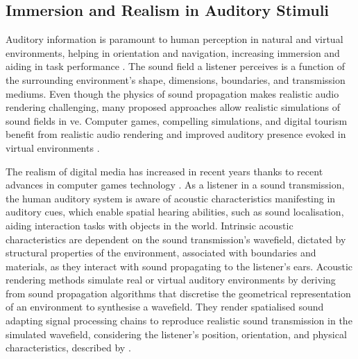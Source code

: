 \subsection{Immersion and Realism in Auditory Stimuli}
Auditory information is paramount to human perception in natural and virtual environments, helping in orientation and navigation, increasing immersion and aiding in task performance \citep{lokki2005navigation, bork2015auditory, shivappa2016efficient}. The sound field a listener perceives is a function of the surrounding environment's shape, dimensions, boundaries, and transmission mediums. Even though the physics of sound propagation makes realistic audio rendering challenging, many proposed approaches allow realistic simulations of sound fields in \acrshort{ve}. Computer games, compelling simulations, and digital tourism benefit from realistic audio rendering and improved auditory presence evoked in virtual environments \citep{lokki2002creating, selmanovic2020vr}.\par
The realism of digital media has increased in recent years thanks to recent advances in computer games technology \citep{rubio2017immersive}. As a listener in a sound transmission, the human auditory system is aware of acoustic characteristics manifesting in auditory cues, which enable spatial hearing abilities, such as sound localisation, aiding interaction tasks with objects in the world. Intrinsic acoustic characteristics are dependent on the sound transmission's wavefield, dictated by structural properties of the environment, associated with boundaries and materials, as they interact with sound propagating to the listener's ears. Acoustic rendering methods simulate real or virtual auditory environments by deriving from sound propagation algorithms that discretise the geometrical representation of an environment to synthesise a wavefield. They render spatialised sound adapting signal processing chains to reproduce realistic sound transmission in the simulated wavefield, considering the listener's position, orientation, and physical characteristics, described by  \citep{hulusic2012acoustic}.\par

